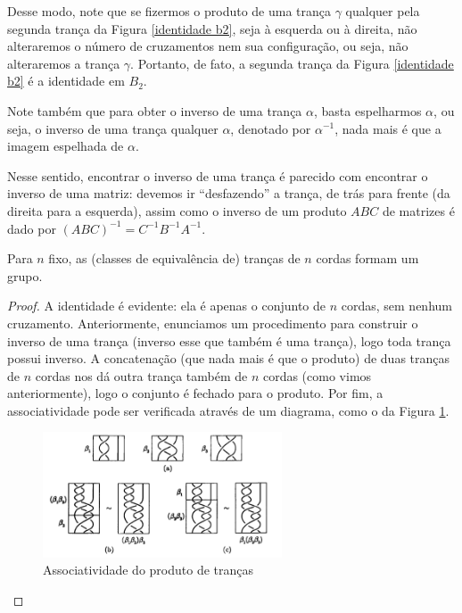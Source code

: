 	\par\vspace{0.3cm} Desse modo, note que se fizermos o produto de uma trança $\gamma$ qualquer pela 
	segunda trança da Figura \ref{identidade b2}, seja à esquerda ou à direita, não alteraremos o número 
	de cruzamentos nem sua configuração, ou seja, não alteraremos a trança $\gamma$. Portanto, de fato, a 
	segunda trança da Figura \ref{identidade b2} é a identidade em $B_2$.
	
	\par\vspace{0.3cm} Note também que para obter o inverso de uma trança $\alpha$, basta espelharmos $\alpha$, 
	ou seja, o inverso de uma trança qualquer $\alpha$, denotado por $\alpha^{-1}$, nada mais é que a imagem
	espelhada de $\alpha$.
	\begin{remark}
		Nesse sentido, encontrar o inverso de uma trança é parecido com encontrar o inverso de uma matriz: 
		devemos ir ``desfazendo'' a trança, de trás para frente (da direita para a esquerda), assim como o 
		inverso de um produto $ABC$ de matrizes é dado por $(ABC)^{-1} = C^{-1}B^{-1}A^{-1}$.
	\end{remark}
	\begin{lemma}
	\label{B_n grupo}
		Para $n$ fixo, as (classes de equivalência de) tranças de $n$ cordas formam um grupo.
	\end{lemma}
	\begin{proof}
		A identidade é evidente: ela é apenas o conjunto de $n$ cordas, sem nenhum cruzamento. 
		Anteriormente, enunciamos um procedimento para construir o inverso de uma trança 
		(inverso esse que também é uma trança), logo toda trança possui inverso. 
		A concatenação (que nada mais é que o produto) de duas 
		tranças de $n$ cordas nos dá outra trança também de $n$ cordas (como vimos anteriormente), 
		logo o conjunto é fechado para o produto. Por fim, a associatividade pode ser verificada através 
		de um diagrama, como o da Figura \ref{associatividade de trancas}.
		\begin{figure}[H]
			\captionsetup{justification=centering}
			\begin{center}
				\includegraphics[width=7.1cm]{Images/associatividade.png}
			\end{center}\caption{Associatividade do produto de tranças}\label{associatividade de trancas}
		\end{figure}
	\end{proof}
